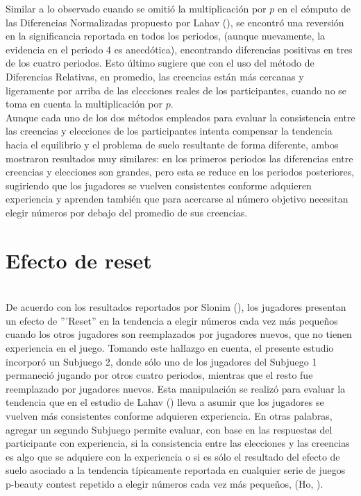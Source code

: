 Similar a lo observado cuando se omitió la multiplicación por $p$ en el cómputo de las Diferencias Normalizadas propuesto por Lahav (\citeyear{Lahav}), se encontró una reversión en la significancia reportada en todos los periodos, (aunque nuevamente, la evidencia en el periodo 4 es anecdótica), encontrando diferencias positivas en tres de los cuatro periodos. Esto último sugiere que con el uso del método de Diferencias Relativas, en promedio, las creencias están más cercanas y ligeramente por arriba de las elecciones reales de los participantes, cuando no se toma en cuenta la multiplicación por $p$.\\

Aunque cada uno de los dos métodos empleados para evaluar la consistencia entre las creencias y elecciones de los participantes intenta compensar la tendencia hacia el equilibrio y el problema de suelo resultante de forma diferente, ambos mostraron resultados muy similares: en los primeros periodos las diferencias entre creencias y elecciones son grandes, pero esta se reduce en los periodos posteriores, sugiriendo que los jugadores se vuelven consistentes conforme adquieren experiencia y aprenden también que para acercarse al número objetivo necesitan elegir números por debajo del promedio de sus creencias.\\

\section{Efecto de reset}\\

De acuerdo con los resultados reportados por Slonim (\citeyear{Slonim}), los jugadores presentan un efecto de '''Reset'' en la tendencia a elegir números cada vez más pequeños cuando los otros jugadores son reemplazados por jugadores nuevos, que no tienen experiencia en el juego. Tomando este hallazgo en cuenta, el presente estudio incorporó un Subjuego 2, donde sólo uno de los jugadores del Subjuego 1 permaneció jugando por otros cuatro periodos, mientras que el resto fue reemplazado por jugadores nuevos. Esta manipulación se realizó para evaluar la tendencia que en el estudio de Lahav (\citeyear{Lahav}) lleva a asumir que los jugadores se vuelven más consistentes conforme adquieren experiencia. En otras palabras, agregar un segundo Subjuego permite evaluar, con base en las respuestas del participante con experiencia, si la consistencia entre las elecciones y las creencias es algo que se adquiere con la experiencia o si es sólo el resultado del efecto de suelo asociado a la tendencia típicamente reportada en cualquier serie de juegos p-beauty contest repetido a elegir números cada vez más pequeños, (Ho, \citeyear{Teck-Hua}).\\

